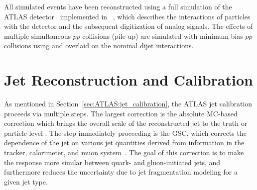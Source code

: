 
All simulated events have been reconstructed using a full simulation of the ATLAS detector~\cite{SOFT-2010-01} implemented in ~\cite{Agostinelli:2002hh}, which describes the interactions of particles with the detector and the subsequent digitization of analog signals.
The effects of multiple simultaneous $pp$ collisions (pile-up) are simulated with minimum bias $pp$ collisions using  and overlaid on the nominal dijet interactions.

\section{Jet Reconstruction and Calibration}
\label{sec:GenNI:jetreco}
As mentioned in Section~\ref{sec:ATLAS:jet_calibration}, the ATLAS jet calibration proceeds via multiple steps.
The largest correction is the absolute MC-based correction which brings the overall scale of the reconstructed jet \ET{} to the truth or particle-level \ET{}.
The step immediately proceeding is the GSC, which corrects the dependence of the jet \pt{} on various jet quantities derived from information in the tracker, calorimeter, and muon system~\cite{PERF-2016-04}.
The goal of this correction is to make the response more similar between quark- and gluon-initiated jets, and furthermore reduces the uncertainty due to jet fragmentation modeling for a given jet type.


